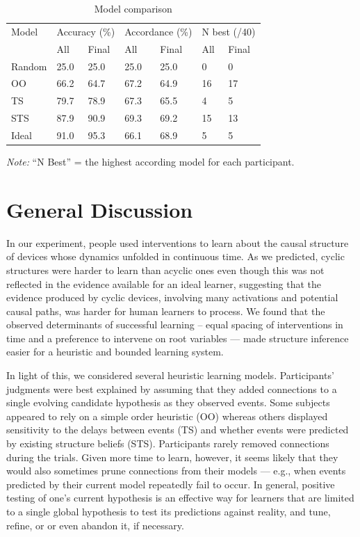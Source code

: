 \documentclass[10pt,letterpaper]{article}
\begin{document}
\begin{table}[b]
\centering
\vspace{-0.4cm}
\caption{Model comparison}
\vspace{-0.2cm}
\label{table:incremental_construction}
\footnotesize{
\begin{tabularx}{\columnwidth}{lXXXXXX}
\toprule
Model & \multicolumn{2}{l}{Accuracy (\%)}  & \multicolumn{2}{l}{Accordance (\%)}  & \multicolumn{2}{l}{N best (/40)}  \\ 
 & All & Final & All & Final & All & Final\\
\midrule
Random & 25.0 & 25.0 & 25.0 & 25.0 & 0 & 0 \\
OO & 66.2 & 64.7 & 67.2 & 64.9 & 16 & 17 \\ 
  TS & 79.7 & 78.9 & 67.3 & 65.5 &  4 &  5 \\ 
  STS & 87.9 & 90.9 & 69.3 & 69.2 & 15 & 13 \\ 
  Ideal & 91.0 & 95.3 & 66.1 & 68.9 &  5 &  5 \\
  \bottomrule
\end{tabularx}}
\footnotesize{\emph{Note:} ``N Best'' = the highest according model for each participant.}\raggedright
\vspace{-0.6cm}
\end{table}

\section{General Discussion}

In our experiment, people used interventions to learn about the causal structure of devices whose dynamics unfolded in continuous time.  As we predicted, cyclic structures were harder to learn than acyclic ones even though this was not reflected in the evidence available for an ideal learner, suggesting that the evidence produced by cyclic devices, involving many activations and potential causal paths, was harder for human learners to process.  We found that the observed determinants of successful learning -- equal spacing of interventions in time and a preference to intervene on root variables --- made structure inference easier for a heuristic and bounded learning system.

In light of this, we considered several heuristic learning models. Participants' judgments were best explained by assuming that they added connections to a single evolving candidate hypothesis as they observed events. Some subjects appeared to rely on a simple order heuristic (OO) whereas others displayed sensitivity to the delays between events (TS) and whether events were predicted by existing structure beliefs (STS).  Participants rarely removed connections during the trials. Given more time to learn, however, it seems likely that they would also sometimes prune connections from their models --- e.g., when events predicted by their current model repeatedly fail to occur.  In general, positive testing of one's current hypothesis is an effective way for learners that are limited to a single global hypothesis to test its predictions against reality, and tune, refine, or or even abandon it, if necessary. 
\end{document}
